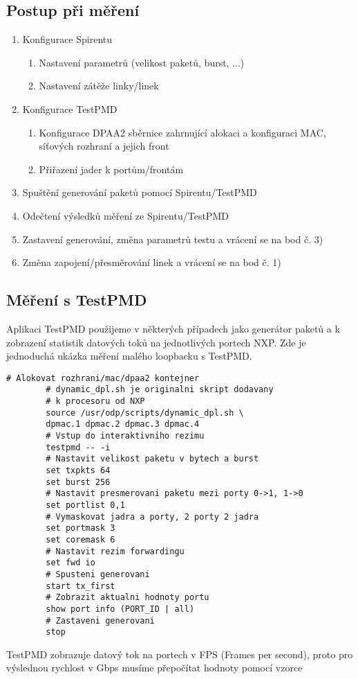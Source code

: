 \documentclass[11pt, titlepage, a4paper]{article}
\begin{document}
		\subsection{Postup při měření}
		\begin{enumerate}
		\item Konfigurace Spirentu
		\begin{enumerate}
		\item Nastavení parametrů (velikost paketů, burst, ...)
		\item Nastavení zátěže linky/linek
		\end{enumerate}
		\item Konfigurace TestPMD
		\begin{enumerate}
		\item Konfigurace DPAA2 sběrnice zahrnující alokaci a konfiguraci MAC, síťových rozhraní a jejich front
		\item Přiřazení jader k portům/frontám
		\end{enumerate}
		\item Spuštění generování paketů pomocí Spirentu/TestPMD
		\item Odečtení výsledků měření ze Spirentu/TestPMD
		\item Zastavení generování, změna parametrů testu a vrácení se na bod č. 3)
		\item Změna zapojení/přesměrování linek a vrácení se na bod č. 1)
		\end{enumerate}


		\subsection{Měření s TestPMD}
		Aplikaci TestPMD použijeme v některých případech jako generátor paketů a k zobrazení statistik datových toků na jednotlivých portech NXP.
		\newline
		\newline
		Zde je jednoduchá ukázka měření malého loopbacku s TestPMD.
		\newline
		\begin{lstlisting}[frame=single]
		# Alokovat rozhrani/mac/dpaa2 kontejner
		# dynamic_dpl.sh je originalni skript dodavany
		# k procesoru od NXP
		source /usr/odp/scripts/dynamic_dpl.sh \
		dpmac.1 dpmac.2 dpmac.3 dpmac.4
		# Vstup do interaktivniho rezimu
		testpmd -- -i
		# Nastavit velikost paketu v bytech a burst
		set txpkts 64
		set burst 256
		# Nastavit presmerovani paketu mezi porty 0->1, 1->0
		set portlist 0,1
		# Vymaskovat jadra a porty, 2 porty 2 jadra
		set portmask 3
		set coremask 6
		# Nastavit rezim forwardingu
		set fwd io
		# Spusteni generovani
		start tx_first
		# Zobrazit aktualni hodnoty portu
		show port info (PORT_ID | all)
		# Zastaveni generovani
		stop
		\end{lstlisting}
		TestPMD zobrazuje datový tok na portech v FPS (Frames per second), proto pro výslednou rychlost v Gbps musíme přepočítat
		hodnoty pomocí vzorce\footnotemark[6]
\end{document}
